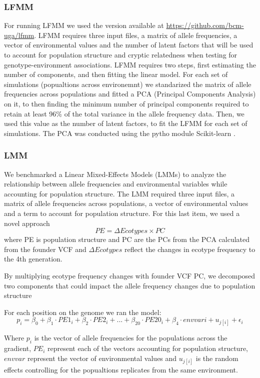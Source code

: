 \documentclass{article}
\begin{document}
\subsubsection{LFMM}
For running LFMM we used the version available at \url{https://github.com/bcm-uga/lfmm}. LFMM requires three input files, a matrix of allele frequencies, a vector of environmental values and the number of latent factors that will be used to account for population structure and cryptic relatedness when testing for genotype-environment associations. LFMM requires two steps, first estimating the number of components, and then fitting the linear model. For each set of simulations (popualtions across environemnt) we standarized the matrix of allele frequencies across populations and fitted a PCA (Principal Components Analysis) on it, to then finding the minimum number of principal components required to retain at least 96\% of the total variance in the allele frequency data. Then, we used this value as the number of latent factors, to fit the LFMM for each set of simulations. The PCA was conducted using the pytho module Scikit-learn \citep{Pedregosa2011-tp}.

\subsubsection{LMM}
We benchmarked a Linear Mixed-Effects Models (LMMs) to analyze the relationship between allele frequencies and environmental variables while accounting for population structure. The LMM required three input files, a matrix of allele frequencies across populations, a vector of environmental values and a term to account for population structure. For this last item, we used a novel approach 
\[
PE = \Delta Ecotypes \times PC 
\]
where PE is population structure and PC are the PCs from the PCA calculated from the founder VCF and $\Delta Ecotypes$ reflect the changes in ecotype frequency to the 4th generation. 

By multiplying ecotype frequency changes with founder VCF PC, we decomposed two components that could impact the allele frequency changes due to 
population structure

For each position on the genome we ran the model:
\begin{equation}
    p_{i} = \beta_{0} + \beta_{1} \cdot PE1_{i} + \beta_{2} \cdot PE2_{i} + ... + \beta_{20} \cdot PE20_{i} + \beta_{4} \cdot envvar{i} + u_{j[i]} + \epsilon_{i}
\end{equation}

Where $p_{i}$ is the vector of allele frequencies for the populations across the gradient, $PE_{i}$ represent each of the vectors accounting for population structure, $env var$ represent the vector of environmental values and $u_{j[i]}$ is the random effects controlling for the popualtions replicates from the same environment. 
\end{document}
